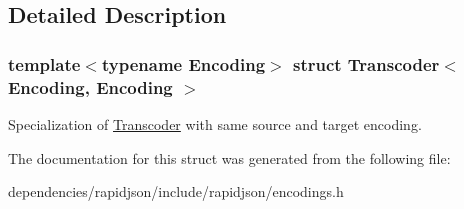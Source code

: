 \subsection{Detailed Description}
\subsubsection*{template$<$typename Encoding$>$\newline
struct Transcoder$<$ Encoding, Encoding $>$}

Specialization of \hyperlink{struct_transcoder}{Transcoder} with same source and target encoding. 

The documentation for this struct was generated from the following file\+:\begin{DoxyCompactItemize}
\item 
dependencies/rapidjson/include/rapidjson/encodings.\+h\end{DoxyCompactItemize}
